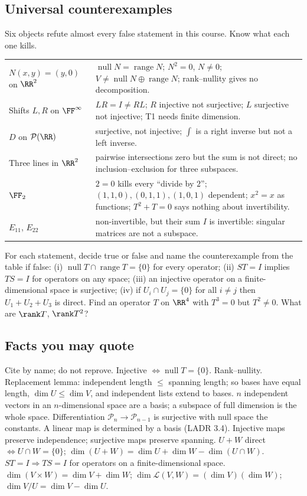 \documentclass[11pt]{scrartcl}
\DeclareMathOperator{\nul}{null}
\DeclareMathOperator{\range}{range}
\newcommand{\LL}{\mathcal L}
\newcommand{\PP}{\mathcal P}
\begin{document}
\subsection{Universal counterexamples}
\begin{theorem*}[T13]
  Six objects refute almost every false statement in this course. Know what each one kills.
\end{theorem*}
\begin{center}
\renewcommand{\arraystretch}{1.25}
\begin{tabular}{p{}p{}}
\hline
$N(x,y)=(y,0)$ on $\RR^2$ & $\nul N=\range N$; $N^2=0$, $N\ne0$; $V\ne\nul N\oplus\range N$; rank--nullity gives no decomposition. \\
Shifts $L,R$ on $\FF^\infty$ & $LR=I\ne RL$; $R$ injective not surjective; $L$ surjective not injective; T1 needs finite dimension. \\
$D$ on $\PP(\RR)$ & surjective, not injective; $\int$ is a right inverse but not a left inverse. \\
Three lines in $\RR^2$ & pairwise intersections zero but the sum is not direct; no inclusion--exclusion for three subspaces. \\
$\FF_2$ & $2=0$ kills every ``divide by $2$''; $(1,1,0),(0,1,1),(1,0,1)$ dependent; $x^2=x$ as functions; $T^2+T=0$ says nothing about invertibility. \\
$E_{11}$, $E_{22}$ & non-invertible, but their sum $I$ is invertible: singular matrices are not a subspace. \\
\hline
\end{tabular}
\end{center}
\probs
\begin{enumerate}[(a)]
  \ii For each statement, decide true or false and name the counterexample from the table if false: (i) $\nul T\cap\range T=\{0\}$ for every operator; (ii) $ST=I$ implies $TS=I$ for operators on any space; (iii) an injective operator on a finite-dimensional space is surjective; (iv) if $U_i\cap U_j=\{0\}$ for all $i\ne j$ then $U_1+U_2+U_3$ is direct.
  \ii Find an operator $T$ on $\RR^4$ with $T^3=0$ but $T^2\ne0$. What are $\rank T$, $\rank T^2$?
\end{enumerate}

\subsection{Facts you may quote}
Cite by name; do not reprove.
Injective $\iff\nul T=\{0\}$.
Rank--nullity.
Replacement lemma: independent length $\le$ spanning length; so bases have equal length, $\dim U\le\dim V$, and independent lists extend to bases.
$n$ independent vectors in an $n$-dimensional space are a basis; a subspace of full dimension is the whole space.
Differentiation $\PP_n\to\PP_{n-1}$ is surjective with null space the constants.
A linear map is determined by a basis (LADR 3.4).
Injective maps preserve independence; surjective maps preserve spanning.
$U+W$ direct $\iff U\cap W=\{0\}$; $\dim(U+W)=\dim U+\dim W-\dim(U\cap W)$.
$ST=I\Rightarrow TS=I$ for operators on a finite-dimensional space.
$\dim(V\times W)=\dim V+\dim W$; $\dim\LL(V,W)=(\dim V)(\dim W)$; $\dim V/U=\dim V-\dim U$.
\end{document}
